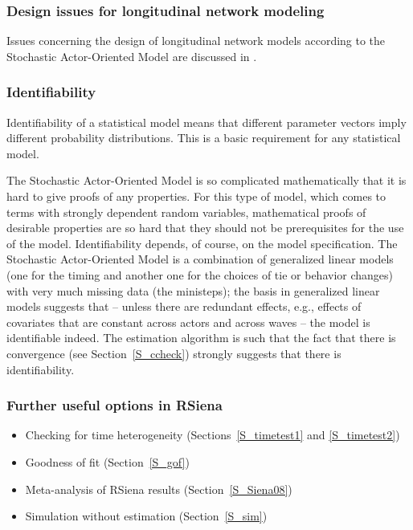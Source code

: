 \documentclass[a4paper,fleqn,11pt]{article}
\newcommand{\+}{\, + \,}
\newcommand{\RS}{{\sf \textsf{RSiena} }}
\newcommand{\SAOM}{{Stochastic Actor-Oriented Model }}
\begin{document}
\subsubsection{Design issues for longitudinal network modeling}

Issues concerning the design of longitudinal network models
according to the \SAOM are discussed in
\citet{StadfeldSnijdersSteglichVanDuijn2018}.

\subsubsection{Identifiability}

Identifiability of a statistical model means that different
parameter vectors imply different probability distributions.
This is a basic requirement for any statistical model.

The \SAOM is so complicated mathematically that it is hard to give
proofs of any properties.
For this type of model, which comes to terms with strongly dependent
random variables, mathematical proofs of desirable properties
are so hard that they should not be prerequisites for the use of the model.
Identifiability depends, of course, on the model specification.
The \SAOM is a combination of generalized linear models
(one for the timing and another one for the choices of tie or behavior changes)
with very much missing data (the ministeps);
the basis in generalized linear models suggests
that -- unless there are redundant effects, e.g.,
effects of covariates that are constant across actors and across
waves -- the model is identifiable indeed.
The estimation algorithm is such that the fact that there is convergence
(see Section~\ref{S_ccheck}) strongly suggests that there is identifiability.


\subsubsection{Further useful options in \RS}
\label{S_etc}
\begin{itemize}
	\item	Checking for time heterogeneity (Sections~\ref{S_timetest1}
            and \ref{S_timetest2})
	\item	Goodness of fit (Section~\ref{S_gof})
	\item	Meta-analysis of \RS results (Section~\ref{S_Siena08})
	\item	Simulation without estimation (Section~\ref{S_sim})
\end{itemize}
\end{document}
